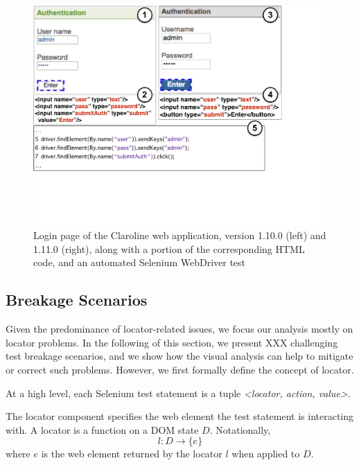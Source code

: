 \begin{figure}[t]
\centering
\includegraphics[trim={0cm 6.5cm 5.5cm 0cm},clip,scale=0.27]{images/claroline-together-2}
\caption{Login page of the Claroline web application, version 1.10.0 (left) and 1.11.0 (right), along with a portion of the corresponding HTML code, and an automated Selenium WebDriver test}
\label{claroline-together}
\end{figure}

\subsection{Breakage Scenarios}\label{sec:breakage-scenarios}

Given the predominance of locator-related issues, we focus our analysis mostly on locator problems. In the following of this section, we present XXX challenging test breakage scenarios, and we show how the visual analysis can help to mitigate or correct such problems. However, we first formally define the concept of locator.

\begin{defn}
At a high level, each Selenium test statement is a tuple \textit{<locator, action, value>}.
\end{defn}

\begin{defn} 
The locator component specifies the web element the test statement is interacting with. A locator is a function on a DOM state $D$. Notationally, $$l: D \rightarrow \{e\}$$ where $e$ is the web element returned by the locator $l$ when applied to $D$. 
\end{defn}


